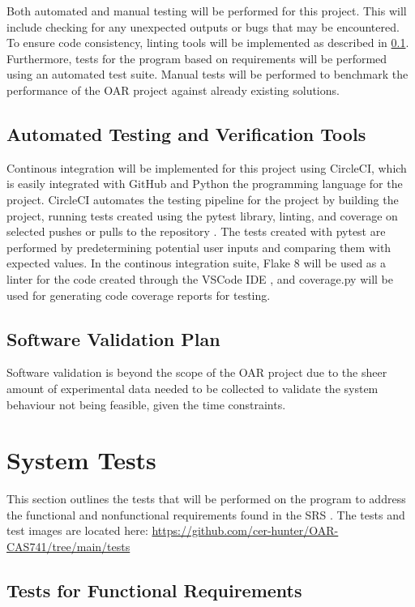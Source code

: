 \documentclass[12pt, titlepage]{article}
\begin{document}
Both automated and manual testing will be performed for this project. This will include checking for any unexpected outputs or bugs that may be encountered.
To ensure code consistency, linting tools will be implemented as described in \ref{Tools}. Furthermore,
tests for the program based on requirements will be performed using an automated test suite. Manual tests will be 
performed to benchmark the performance of the OAR project against already existing solutions.


\subsection{Automated Testing and Verification Tools} \label{Tools}

Continous integration will be implemented for this project using CircleCI, which 
is easily integrated with GitHub and Python the programming language for the project. CircleCI automates the testing 
pipeline for the project by building the project, running tests created using the pytest library, linting, and coverage
on selected pushes or pulls to the repository \citep{CircleCI}. The tests created with pytest are performed by predetermining potential user
inputs and comparing them with expected values. In the continous integration suite, Flake 8 will be used as a 
linter for the code created through the VSCode IDE \citep{Flake8}, and coverage.py will be used for generating code coverage reports
for testing.

\subsection{Software Validation Plan}

Software validation is beyond the scope of the OAR project due to the sheer amount of experimental data needed to be collected to 
validate the system behaviour not being feasible, given the time constraints. 

\section{System Tests}

This section outlines the tests that will be performed on the program to address the functional and nonfunctional requirements
found in the SRS \citep{SRS}. The tests and test images are located here:
\url{https://github.com/cer-hunter/OAR-CAS741/tree/main/tests}

	
\subsection{Tests for Functional Requirements}
\end{document}
